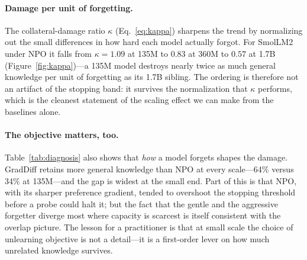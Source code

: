 \documentclass[sigconf,nonacm]{acmart}
\begin{document}
\paragraph{Damage per unit of forgetting.} The collateral-damage ratio $\kappa$ (Eq.~\eqref{eq:kappa}) sharpens the trend by normalizing out the small differences in how hard each model actually forgot. For SmolLM2 under NPO it falls from $\kappa{=}1.09$ at 135M to $0.83$ at 360M to $0.57$ at 1.7B (Figure~\ref{fig:kappa})---a 135M model destroys nearly twice as much general knowledge per unit of forgetting as its 1.7B sibling. The ordering is therefore not an artifact of the stopping band: it survives the normalization that $\kappa$ performs, which is the cleanest statement of the scaling effect we can make from the baselines alone.

\paragraph{The objective matters, too.} Table~\ref{tab:diagnosis} also shows that \emph{how} a model forgets shapes the damage. GradDiff retains more general knowledge than NPO at every scale---64\% versus 34\% at 135M---and the gap is widest at the small end. Part of this is that NPO, with its sharper preference gradient, tended to overshoot the stopping threshold before a probe could halt it; but the fact that the gentle and the aggressive forgetter diverge most where capacity is scarcest is itself consistent with the overlap picture. The lesson for a practitioner is that at small scale the choice of unlearning objective is not a detail---it is a first-order lever on how much unrelated knowledge survives.
\end{document}
